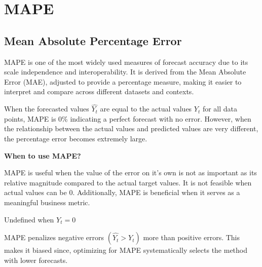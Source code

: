 \clearpage
\thispagestyle{regressionstyle}
\section{MAPE}
\subsection{Mean Absolute Percentage Error}

MAPE is one of the most widely used measures of forecast accuracy due to its scale independence and interoperability.
It is derived from the Mean Absolute Error (MAE), adjusted to provide a percentage measure, making it easier to interpret and compare across different datasets and contexts.

\begin{center}
\end{center}

When the forecasted values $\hat{Y_{t}}$ are equal to the actual values $Y_{t}$ for all data points, MAPE is 0\% indicating a perfect forecast with no error.
However, when the relationship between the actual values and predicted values are very different, the percentage error becomes extremely large.

\textbf{When to use MAPE?}

MAPE is useful when the value of the error on it's own is not as important as its relative magnitude compared to the actual target values.
It is not feasible when actual values can be 0. Additionally, MAPE is beneficial when it serves as a meaningful business metric.

{
    \item Undefined when $Y_{t} = 0$
    \item MAPE penalizes negative errors $(\hat{Y_{t}} > Y_{t})$ more than positive errors. This makes it biased since, optimizing for MAPE systematically selects the method with lower forecasts.
}

